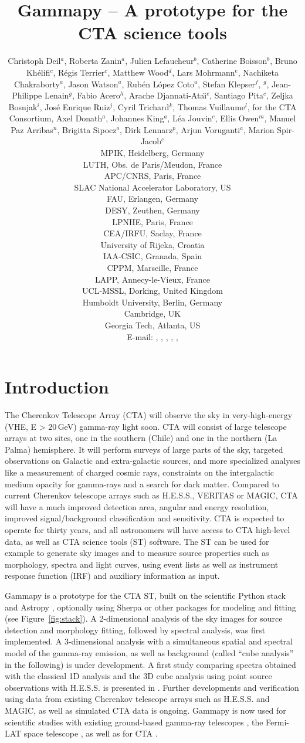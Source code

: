 \documentclass{PoS}
\title{Gammapy -- A prototype for the CTA science tools}
\author{
Christoph Deil$^a$,
Roberta Zanin$^a$,
Julien Lefaucheur$^b$,
Catherine Boisson$^b$,
Bruno Kh\'elifi$^c$,
R\'egis Terrier$^c$,
Matthew Wood$^d$,
Lars Mohrmann$^e$,
Nachiketa Chakraborty$^a$,
Jason Watson$^a$,
Rub\'en L\'opez Coto$^a$,
Stefan Klepser$^f$,
\speaker{Matteo Cerruti}$^g$,
Jean-Philippe Lenain$^g$,
Fabio Acero$^h$,
Arache Djannati-Ata{\"\i}$^c$,
Santiago Pita$^c$,
Zeljka Bosnjak$^i$,
Jos\'e Enrique Ruiz$^j$,
Cyril Trichard$^k$,
Thomas Vuillaume$^l$,
for the CTA Consortium,
Axel Donath$^a$,
Johannes King$^a$,
L\'ea Jouvin$^c$,
Ellis Owen$^m$,
Manuel Paz Arribas$^n$,
Brigitta Sipocz$^o$,
Dirk Lennarz$^p$,
Arjun Voruganti$^a$,
Marion Spir-Jacob$^c$
\\
\llap{$^a$}MPIK, Heidelberg, Germany\\
\llap{$^b$}LUTH, Obs. de Paris/Meudon, France\\
\llap{$^c$}APC/CNRS, Paris, France\\
\llap{$^d$}SLAC National Accelerator Laboratory, US\\
\llap{$^e$}FAU, Erlangen, Germany\\
\llap{$^f$}DESY, Zeuthen, Germany\\
\llap{$^g$}LPNHE, Paris, France\\
\llap{$^h$}CEA/IRFU, Saclay, France\\
\llap{$^i$}University of Rijeka, Croatia\\
\llap{$^j$}IAA-CSIC, Granada, Spain\\
\llap{$^k$}CPPM, Marseille, France\\
\llap{$^l$}LAPP, Annecy-le-Vieux, France\\
\llap{$^m$}UCL-MSSL, Dorking, United Kingdom\\
\llap{$^n$}Humboldt University, Berlin, Germany\\
\llap{$^o$}Cambridge, UK\\
\llap{$^p$}Georgia Tech, Atlanta, US\\
E-mail:
\email{Christoph.Deil@mpi-hd.mpg.de},
\email{Roberta.Zanin@mpi-hd.mpg.de},
\email{julien.lefaucheur@obspm.fr},
\email{catherine.boisson@obspm.fr},
\email{khelifi@apc.in2p3.fr},
}
\begin{document}
\section{Introduction}
\label{sec:intro}

The Cherenkov Telescope Array (CTA) will observe the sky in very-high-energy
(VHE, E > 20$\,$GeV) gamma-ray light soon. CTA will consist of large telescope
arrays at two sites, one in the southern (Chile) and one in the northern (La
Palma) hemisphere. It will perform surveys of large parts of the sky, targeted
observations on Galactic and extra-galactic sources, and more specialized
analyses like a measurement of charged cosmic rays, constraints on the
intergalactic medium opacity for gamma-rays and a search for dark matter.
Compared to current Cherenkov telescope arrays such as H.E.S.S., VERITAS or
MAGIC, CTA will have a much improved detection area, angular and energy
resolution, improved signal/background classification and sensitivity. CTA is
expected to operate for thirty years, and all astronomers will have access to
CTA high-level data, as well as CTA science tools (ST) software. The ST can be
used for example to generate sky images and to measure source properties such as
morphology, spectra and light curves, using event lists as well as instrument
response function (IRF) and auxiliary information as input. 

Gammapy is a prototype for the CTA ST, built on the scientific Python stack and
Astropy \cite{astropy}, optionally using Sherpa \cite{sherpa2001, sherpa2009,
sherpa2011} or other packages for modeling and fitting (see
Figure~\ref{fig:stack}). A 2\hbox{-}dimensional analysis of the sky images 
for source detection and morphology fitting, followed by spectral analysis, was first 
implemented. A 3\hbox{-}dimensional analysis with a simultaneous spatial and spectral model of
the gamma-ray emission, as well as background (called ``cube analysis'' in the
following) is under development.
A first study comparing spectra obtained with the classical 1D analysis and the
3D cube analysis using point source observations with H.E.S.S. is presented in \cite{lea}. Further
developments and verification using data from existing Cherenkov telescope
arrays such as H.E.S.S. and MAGIC, as well as simulated CTA data is ongoing.
Gammapy is now used for scientific studies with existing ground-based
gamma-ray telescopes \cite{hgps, shells}, the Fermi-LAT space telescope
\cite{owen2015}, as well as for CTA \cite{julien, roberta, cyril}.
\end{document}
